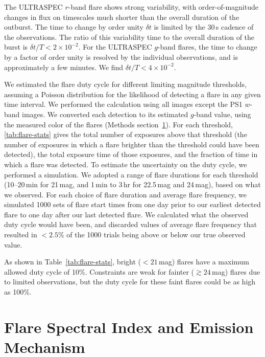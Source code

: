 \documentclass{nature_plusfigure}
\begin{document}
\begin{methods}
The ULTRASPEC $r$-band flare shows strong variability, with order-of-magnitude changes in flux on timescales much shorter than the overall duration of the outburst. The time to change by order unity $\delta t$ is limited by the 30\,s cadence of the observations. The ratio of this variability time to the overall duration of the burst is $\delta t/T<2\times10^{-2}$. For the ULTRASPEC $g$-band flares, the time to change by a factor of order unity is resolved by the individual observations, and is approximately a few minutes. We find $\delta t/T<4\times10^{-2}$.

We estimated the flare duty cycle for different limiting magnitude thresholds, assuming a Poisson distribution for the likelihood of detecting a flare in any given time interval. We performed the calculation using all images except the PS1 $w$-band images.
We converted each detection to its estimated $g$-band value, using the measured color of the flares (Methods section~\ref{sec:flare-emission-mechanism}). 
For each threshold, \ref{tab:flare-stats} gives the total number of exposures above that threshold (the number of exposures in which a flare brighter than the threshold could have been detected), the total exposure time of those exposures, and the fraction of time in which a flare was detected. To estimate the uncertainty on the duty cycle, we performed a simulation. We adopted a range of flare durations for each threshold (10--20\,min for 21\,mag, and 1\,min to 3\,hr for 22.5\,mag and 24\,mag), based on what we observed. For each choice of flare duration and average flare frequency, we simulated 1000 sets of flare start times from one day prior to our earliest detected flare to one day after our last detected flare. We calculated what the observed duty cycle would have been, and discarded values of average flare frequency that resulted in $<2.5\%$ of the 1000 trials being above or below our true observed value. %

As shown in Table~\ref{tab:flare-stats}, bright ($<21$\,mag) flares have a maximum allowed duty cycle of 10\%. Constraints are weak for fainter ($\gtrsim24$\,mag) flares due to limited observations, but the duty cycle for these faint flares could be as high as 100\%.  

\section{Flare Spectral Index and Emission Mechanism}
\label{sec:flare-emission-mechanism}


\end{methods}
\end{document}
